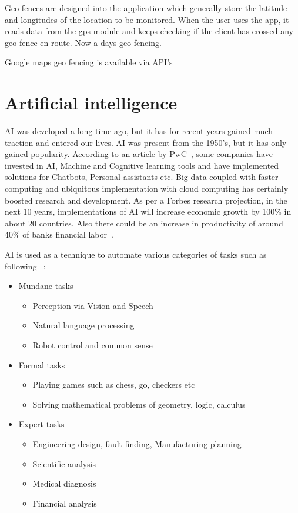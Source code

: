 Geo fences are designed into the application which generally store the latitude and longitudes of the location to be monitored. When the user uses the app, it reads data from the gps module and keeps checking if the client has crossed any geo fence en-route. Now-a-days geo fencing.

Google maps geo fencing is available via API's 

\newpage
\section{Artificial intelligence}
AI was developed a long time ago, but it has for recent years gained much traction and entered our lives. AI was present from the 1950's, but it has only gained popularity.
According to an article by PwC~, some companies have invested in AI, Machine and Cognitive learning tools and have implemented solutions for Chatbots, Personal assistants etc. Big data coupled with faster computing and ubiquitous implementation with cloud computing has certainly boosted research and development.
As per a Forbes research projection, in the next 10 years, implementations of AI will increase economic growth by 100\% in about 20 countries. Also there could be an increase in productivity of around 40\% of banks financial labor~.

AI is used as a technique to automate various categories of tasks such as following~ :
\begin{itemize}
	\item Mundane tasks
		\begin{itemize}
			\item Perception via Vision and Speech
			\item Natural language processing 
			\item Robot control and common sense
		\end{itemize}
	\item Formal tasks
	\begin{itemize}
		\item Playing games such as chess, go, checkers etc
		\item Solving mathematical problems of geometry, logic, calculus
	\end{itemize}
	\item Expert tasks
	\begin{itemize}
		\item Engineering design, fault finding, Manufacturing planning
		\item Scientific analysis
		\item Medical diagnosis
		\item Financial analysis
	\end{itemize}
\end{itemize}



